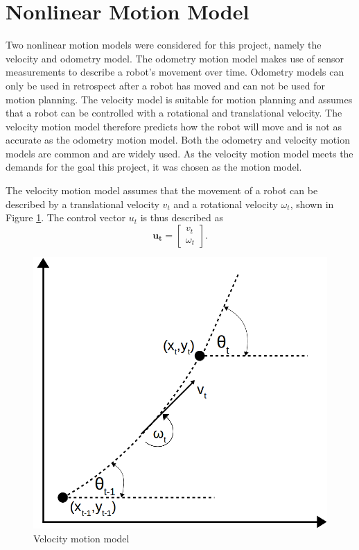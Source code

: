 \documentclass[12pt,oneside,openany,a4paper, %
afrikaans,english,
]{memoir}
\numberwithin{equation}{chapter}
\begin{document}
\section{Nonlinear Motion Model}\label{vmodel}
Two nonlinear motion models were considered for this project, namely the velocity and odometry model. The odometry motion model makes use of sensor measurements to describe a robot's movement over time. Odometry models can  only be used in retrospect after a robot has moved and can not be used for motion planning. The velocity model is suitable for motion planning and assumes that a robot can be controlled with a rotational and translational velocity. The velocity motion model therefore predicts how the robot will move and is not as accurate as the odometry motion model. Both the odometry and velocity motion models are common and are widely used. As the velocity motion model meets the demands for the goal this project, it was chosen as the motion model.

The velocity motion model assumes that the movement of a robot can be described by a translational velocity $v_t$ and a rotational velocity $\omega_t$, shown in Figure \ref{fig:vel_model}. The control vector $u_t$ is thus described as
\begin{equation}
\bm{u_t} = 
\begin{bmatrix}
v_t\\
\omega_t
\end{bmatrix}.
\end{equation}
\begin{figure}
  \includegraphics[width=0.4\linewidth]{Figures/velocity_model.png}
  \centering
  \caption{Velocity motion model}
  \label{fig:vel_model}
\end{figure}
\end{document}
